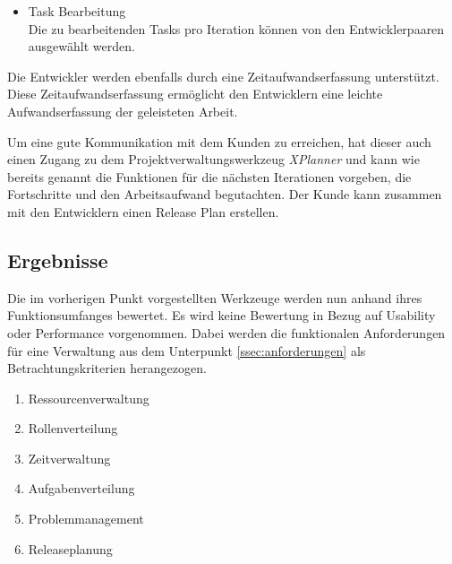 \begin{description}
\begin{itemize}
\item Task Bearbeitung\\
Die zu bearbeitenden Tasks pro Iteration können von den Entwicklerpaaren ausgewählt werden. 
\end{itemize}

Die Entwickler werden ebenfalls durch eine Zeitaufwandserfassung unterstützt. Diese Zeitaufwandserfassung ermöglicht den Entwicklern eine leichte Aufwandserfassung der geleisteten Arbeit.

Um eine gute Kommunikation mit dem Kunden zu erreichen, hat dieser auch einen Zugang zu dem Projektverwaltungswerkzeug \emph{XPlanner} und kann wie bereits genannt die Funktionen für die nächsten Iterationen vorgeben, die Fortschritte und den Arbeitsaufwand begutachten. Der Kunde kann zusammen mit den Entwicklern einen Release Plan erstellen. \cite{bib:xplanner}

\end{description}

\subsection{Ergebnisse}
Die im vorherigen Punkt vorgestellten Werkzeuge werden nun anhand ihres Funktionsumfanges bewertet. Es wird keine Bewertung in Bezug  auf Usability oder Performance vorgenommen.  Dabei werden die funktionalen Anforderungen für eine Verwaltung aus dem Unterpunkt \ref{ssec:anforderungen} als Betrachtungskriterien herangezogen.

\begin{enumerate}
\item Ressourcenverwaltung \label{enum:ress}
\item Rollenverteilung \label{enum:roll}
\item Zeitverwaltung \label{enum:zeit}
\item Aufgabenverteilung \label{enum:aufg}
\item Problemmanagement \label{enum:prob}
\item Releaseplanung \label{enum:rele}
\end{enumerate}

